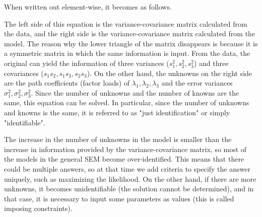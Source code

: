 \documentclass{ltjsbook}
\begin{document}


When written out element-wise, it becomes as follows.


The left side of this equation is the variance-covariance matrix calculated from the data, and the right side is the variance-covariance matrix calculated from the model. The reason why the lower triangle of the matrix disappears is because it is a symmetric matrix in which the same information is input. From the data, the original can yield the information of three variances ($s_1^2,s_2^2,s_3^2$) and three covariances ($s_1s_2,s_1s_3,s_2s_3$). On the other hand, the unknowns on the right side are the path coefficients (factor loads) of $\lambda_1,\lambda_2,\lambda_3$ and the error variances $\sigma_1^2,\sigma_2^2,\sigma_3^2$. Since the number of unknowns and the number of knowns are the same, this equation can be solved. In particular, since the number of unknowns and knowns is the same, it is referred to as "just identification" or simply "identifiable".

The increase in the number of unknowns in the model is smaller than the increase in information provided by the variance-covariance matrix, so most of the models in the general SEM become over-identified. This means that there could be multiple answers, so at that time we add criteria to specify the answer uniquely, such as maximizing the likelihood. On the other hand, if there are more unknowns, it becomes unidentifiable (the solution cannot be determined), and in that case, it is necessary to input some parameters as values (this is called imposing constraints).
\end{document}
